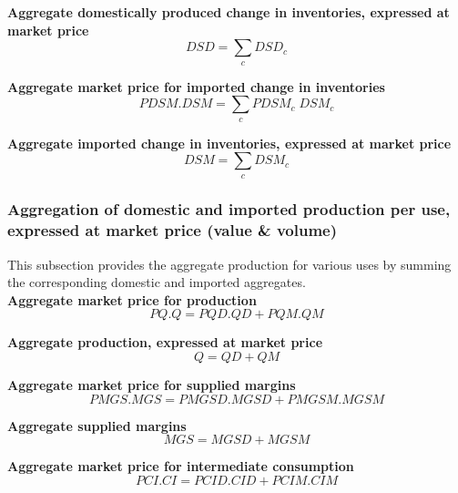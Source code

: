 \documentclass[12pt]{article}
\numberwithin{equation}{section}
\begin{document}
\noindent \textbf{Aggregate domestically produced change in inventories, expressed at market price} 
\begin{dmath}
DSD = \sum_{c} DSD_{c}
\label{SU.mdlDSD}
\end{dmath}

\noindent \textbf{Aggregate market price for imported change in inventories} 
\begin{dmath}
PDSM . DSM = \sum_{c} PDSM_{c} \; DSM_{c}
\label{SU.mdlPDSM}
\end{dmath}

\noindent \textbf{Aggregate imported change in inventories, expressed at market price} 
\begin{dmath}
DSM = \sum_{c} DSM_{c}
\label{SU.mdlDSM}
\end{dmath}




\subsubsection{Aggregation of domestic and imported production per use, expressed at market price (value \& volume)}



This subsection provides the aggregate production for various uses by summing the corresponding domestic and imported aggregates. \\

\noindent \textbf{Aggregate market price for production} 
\begin{dmath}
PQ . Q = PQD . QD + PQM . QM
\label{SU.mdlPQ}
\end{dmath}

\noindent \textbf{Aggregate production, expressed at market price} 
\begin{dmath}
Q = QD + QM
\label{SU.mdlQ}
\end{dmath}

\noindent \textbf{Aggregate market price for supplied margins} 
\begin{dmath}
PMGS . MGS = PMGSD . MGSD + PMGSM . MGSM
\label{SU.mdlPMGS}
\end{dmath}

\noindent \textbf{Aggregate supplied margins} 
\begin{dmath}
MGS = MGSD + MGSM
\label{SU.mdlMGS}
\end{dmath}

\noindent \textbf{Aggregate market price for intermediate consumption} 
\begin{dmath}
PCI . CI = PCID . CID + PCIM . CIM
\label{SU.mdlPCI}
\end{dmath}
\end{document}
